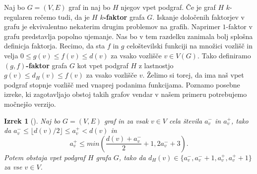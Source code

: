 \documentclass[12pt,a4paper,twoside]{article}
\theoremstyle{definition} %
\theoremstyle{plain} %
\newtheorem{izrek}[definicija]{Izrek}
\numberwithin{equation}{section}  %
\begin{document}
Naj bo $G =(V, E)$ graf in naj bo $H$ njegov vpet podgraf. Če je graf $H$ $k$-regularen rečemo tudi, da je $H$ \textbf{$k$-faktor} grafa $G$.  Iskanje določenih faktorjev v grafu je ekvivalentno nekaterim drugim problemov na grafih. Naprimer $1$-faktor v grafu predstavlja popolno ujemanje. Nas bo v tem razdelku zanimala bolj splošna definicja faktorja.  Recimo, da sta $f$ in $g$ celoštevilski funkciji na množici vozlišč in velja $0 \le g(v) \le f(v) \le d(v)$ za vsako vozlišče $v \in V(G)$. Tako definiramo \textbf{$(g,f)$-faktor} grafa $G$ kot vpet podgraf $H$ z lastnostjo $g(v) \le d_H(v) \le f(v)$ za vsako vozlišče $v$. Želimo si torej, da ima naš vpet podgraf stopnje vozlišč med vnaprej podanima funkcijama. Poznamo posebne izreke, ki zagotavljajo obstoj takih grafov vendar v našem primeru potrebujemo močnejšo verzijo.



\begin{izrek}[\citet{random12}]
\label{factor}
Naj bo $G = (V, E)$ graf in za vsak $v \in V$ cela števila $a_v^-$ in $a_v^+$, tako da $a_v^- \le \lfloor d(v)/2 \rfloor \le a_v^+ < d(v)$ in $$a_v^+ \le min \left( \frac{d(v) + a_v^-}{2} + 1, 2a_v^- + 3 \right).$$ Potem obstaja vpet podgraf $H$ grafa $G$, tako da $d_H(v) \in \{ a_v^-, a_v^- + 1, a_v^+, a_v^+ + 1\}$ za vse $v \in V$.
\end{izrek}
\end{document}
